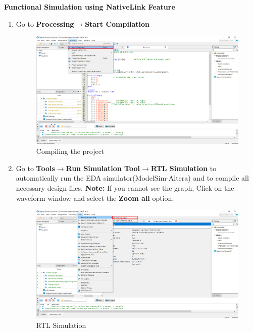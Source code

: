 \documentclass[12pt,singleside,a4paper]{article}
\begin{document}
 \noindent \textbf{Functional Simulation using NativeLink Feature}
    \begin{enumerate}
        
        \item  Go to \textbf{Processing}$\rightarrow$\textbf{Start Compilation}
            \begin{figure}[H]
                \centering
                \includegraphics[width=14cm,keepaspectratio]{posttest1.png}
            \caption{Compiling the project}
            \end{figure}
    
        \newpage
        \item Go to \textbf{Tools}$\rightarrow$\textbf{Run Simulation Tool}$\rightarrow$\textbf{RTL Simulation} to automatically run the EDA simulator(ModelSim-Altera) and to compile all necessary design files.
        \newline\textbf{Note:} If you cannot see the graph, Click on the waveform window and select the \textbf{Zoom all} option.
            \begin{figure}[H]
                \centering
                \includegraphics[width=14cm,keepaspectratio]{posttest2.png}
            \caption{RTL Simulation}
            \end{figure}


\end{enumerate}
\end{document}
